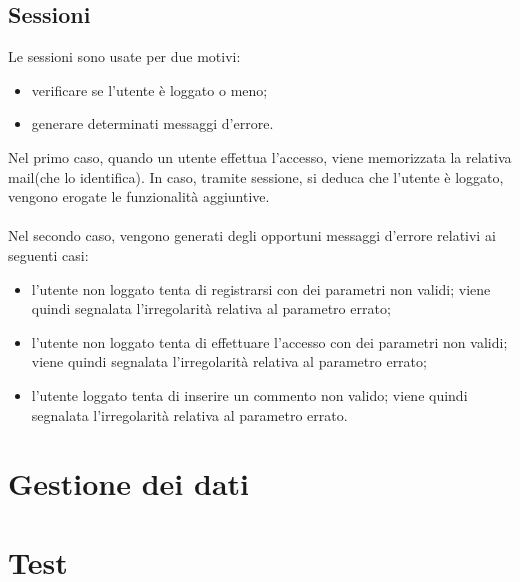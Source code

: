  \subsection{Sessioni}
 Le sessioni sono usate per due motivi:
 \begin{itemize}
 	\item verificare se l'utente è loggato o meno;
 	\item generare determinati messaggi d'errore.
 \end{itemize}
 Nel primo caso, quando un utente effettua l'accesso, viene memorizzata la relativa mail(che lo identifica). In caso, tramite sessione, si deduca che l'utente è loggato, vengono erogate le funzionalità aggiuntive. \\ \\
 Nel secondo caso, vengono generati degli opportuni messaggi d'errore relativi ai seguenti casi:
 \begin{itemize}
 	\item l'utente non loggato tenta di registrarsi con dei parametri non validi; viene quindi segnalata l'irregolarità relativa al parametro errato;
 	\item l'utente non loggato tenta di effettuare l'accesso con dei parametri non validi; viene quindi segnalata l'irregolarità relativa al parametro errato;
 	\item l'utente loggato tenta di inserire un commento non valido; viene quindi segnalata l'irregolarità relativa al parametro errato.
 \end{itemize}

\section{Gestione dei dati}
\section{Test}


